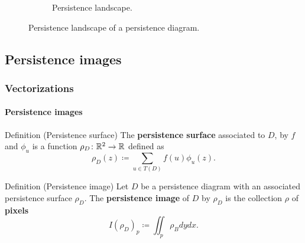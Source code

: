 \documentclass[aspectratio=169]{beamer}
\begin{document}
\begin{frame}
\begin{figure}
\begin{subfigure}[b]{0.25\linewidth}
            \caption{Persistence landscape.}
        \end{subfigure}
        \caption{Persistence landscape of a persistence diagram.}
    \end{figure}
\end{frame}

\subsection{Persistence images}

\begin{frame}
  \frametitle{Vectorizations}
  \framesubtitle{Persistence images}

  \begin{block}{Definition (Persistence surface)}
    The {\bf persistence surface} associated to $ D $, by $ f $ and $ \phi_u $ is a function $ \rho_D \colon \mathbb R^2 \to \mathbb R $ defined as
    \begin{equation}
        \rho_D(z) \coloneq \sum_{u \in T(D)} f(u) \phi_u(z).
    \end{equation}
  \end{block}
  \pause
  \begin{block}{Definition (Persistence image)}
    Let $ D $ be a persistence diagram with an associated persistence surface $ \rho_D $. The {\bf persistence image} of $ D $ by $ \rho_D $ is the collection $ \rho $ of {\bf pixels}
    \begin{equation}
        I(\rho_D)_p \coloneq \iint_p \rho_B dy dx.
    \end{equation}
  \end{block}
\end{frame}
\end{document}
